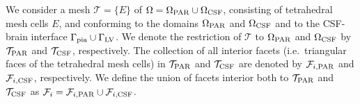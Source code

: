 \documentclass[fleqn,10pt]{wlscirep}
\begin{document}

We consider a mesh $\mathcal{T} = \{ E \}$ of $\Omega = \Omega_{\rm
  PAR} \cup \Omega_{\rm CSF}$, consisting of tetrahedral mesh cells
$E$, and conforming to the domains $\Omega_{\rm PAR}$ and $\Omega_{\rm
  CSF}$ and to the CSF-brain interface $\Gamma_{\rm pia} \cup
\Gamma_{\rm LV}$. We denote the restriction of $\mathcal{T}$ to
$\Omega_{\rm PAR}$ and $\Omega_{\rm CSF}$ by $\mathcal{T}_{\rm PAR}$
and $\mathcal{T}_{\rm CSF}$, respectively. The collection of all
interior facets (i.e.~triangular faces of the tetrahedral mesh cells)
in $\mathcal{T}_{\rm PAR}$ and $\mathcal{T}_{\rm CSF}$ are denoted by
$\mathcal{F}_{i, \rm PAR}$ and $\mathcal{F}_{i, \rm CSF}$,
respectively. We define the union of facets interior both to
$\mathcal{T}_{ \rm PAR}$ and $\mathcal{T}_{ \rm CSF}$ as
$\mathcal{F}_i = \mathcal{F}_{i, \rm PAR} \cup \mathcal{F}_{i, \rm
  CSF}$. 

\end{document}
